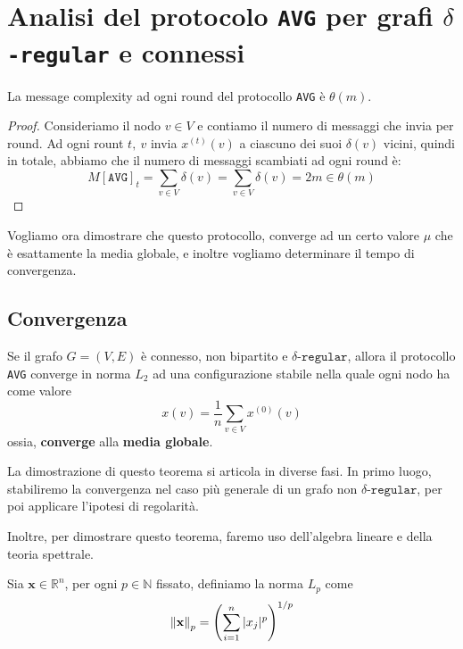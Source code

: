 \section{Analisi del protocolo \texttt{AVG} per grafi $\delta$\texttt{-regular} e connessi}

\begin{teorema}
    La message complexity ad ogni round del protocollo \texttt{AVG} è $\theta(m)$.
    \begin{proof}
        Consideriamo il nodo $v \in V$ e contiamo il numero di messaggi che invia per round. Ad ogni rount $t,\ v$ invia $x^{(t)}(v)$ a ciascuno dei suoi $\delta(v)$ vicini, quindi in totale, abbiamo che il numero di messaggi scambiati ad ogni round è:
        \[
            M[\texttt{AVG}]_t = \sum_{v \in V} \delta(v) = \sum_{v \in V} \delta(v) = 2m \in \theta(m)
        \]
    \end{proof}
\end{teorema}

Vogliamo ora dimostrare che questo protocollo, converge ad un certo valore $\mu$ che è esattamente la media globale, e inoltre vogliamo determinare il tempo di convergenza.

\subsection{Convergenza}

\begin{teorema}[Convergenza]\label{teo:convergenza}
    Se il grafo $G = (V, E)$ è connesso, non bipartito e $\delta\texttt{-regular}$, allora il protocollo \texttt{AVG} converge in norma $L_2$ ad una configurazione stabile nella quale ogni nodo ha come valore 
    \[
        x(v) = \frac{1}{n}\sum_{v \in V} x^{(0)}(v)
    \]
    ossia, \textbf{converge} alla \textbf{media globale}.
\end{teorema}

La dimostrazione di questo teorema si articola in diverse fasi. In primo luogo, stabiliremo la convergenza nel caso più generale di un grafo non $\delta\texttt{-regular}$, per poi applicare l'ipotesi di regolarità.

Inoltre, per dimostrare questo teorema, faremo uso dell'algebra lineare e della teoria spettrale.

\begin{definizione}[Norma $L_p$]
    Sia $\mathbf{x} \in \mathbb{R}^n$, per ogni $p \in \mathbb{N}$ fissato, definiamo la norma $L_p$ come
    \[
        \norm{\mathbf{x}}_p = \left( \sum_{i = 1}^{n} |x_j|^p \right)^{1/p}
    \]
\end{definizione}

